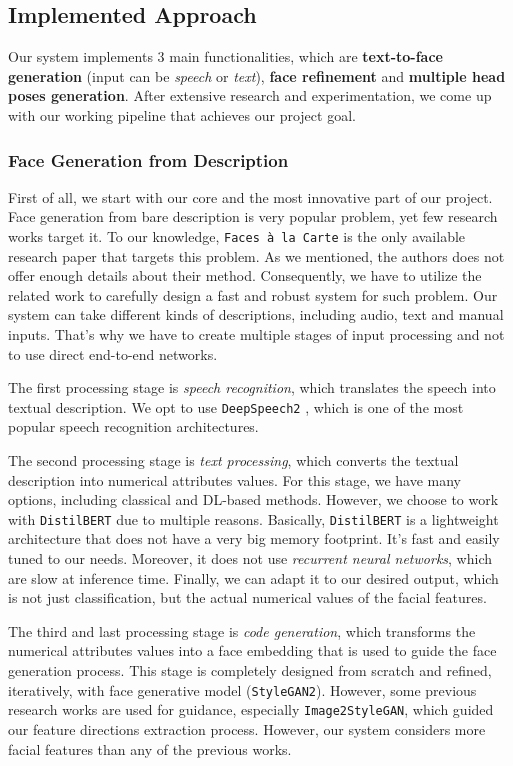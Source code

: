 \subsection{Implemented Approach}
Our system implements $3$ main functionalities, which are \textbf{text-to-face generation} (input can be \emph{speech} or \emph{text}), \textbf{face refinement} and \textbf{multiple head poses generation}. After extensive research and experimentation, we come up with our working pipeline that achieves our project goal.

\subsubsection{Face Generation from Description}
First of all, we start with our core and the most innovative part of our project. Face generation from bare description is very popular problem, yet few research works target it. To our knowledge, \texttt{Faces à la Carte} is the only available research paper that targets this problem. As we mentioned, the authors does not offer enough details about their method. Consequently, we have to utilize the related work to carefully design a fast and robust system for such problem. 
Our system can take different kinds of descriptions, including audio, text and manual inputs. That's why we have to create multiple stages of input processing and not to use direct end-to-end networks. 

The first processing stage is \emph{speech recognition}, which translates the speech into textual description. We opt to use \texttt{DeepSpeech2} \cite{amodei2015deep}, which is one of the most popular speech recognition architectures.

The second processing stage is \emph{text processing}, which converts the textual description into numerical attributes values. For this stage, we have many options, including classical and DL-based methods. However, we choose to work with \texttt{DistilBERT} \cite{sanh2020distilbert} due to multiple reasons. Basically, \texttt{DistilBERT} is a lightweight architecture that does not have a very big memory footprint. It's fast and easily tuned to our needs. Moreover, it does not use \emph{recurrent neural networks}, which are slow at inference time. Finally, we can adapt it to our desired output, which is not just classification, but the actual numerical values of the facial features.

The third and last processing stage is \emph{code generation}, which transforms the numerical attributes values into a face embedding that is used to guide the face generation process. This stage is completely designed from scratch and refined, iteratively, with face generative model (\texttt{StyleGAN2}). However, some previous research works are used for guidance, especially \texttt{Image2StyleGAN}, which guided our feature directions extraction process. However, our system considers more facial features than any of the previous works.

